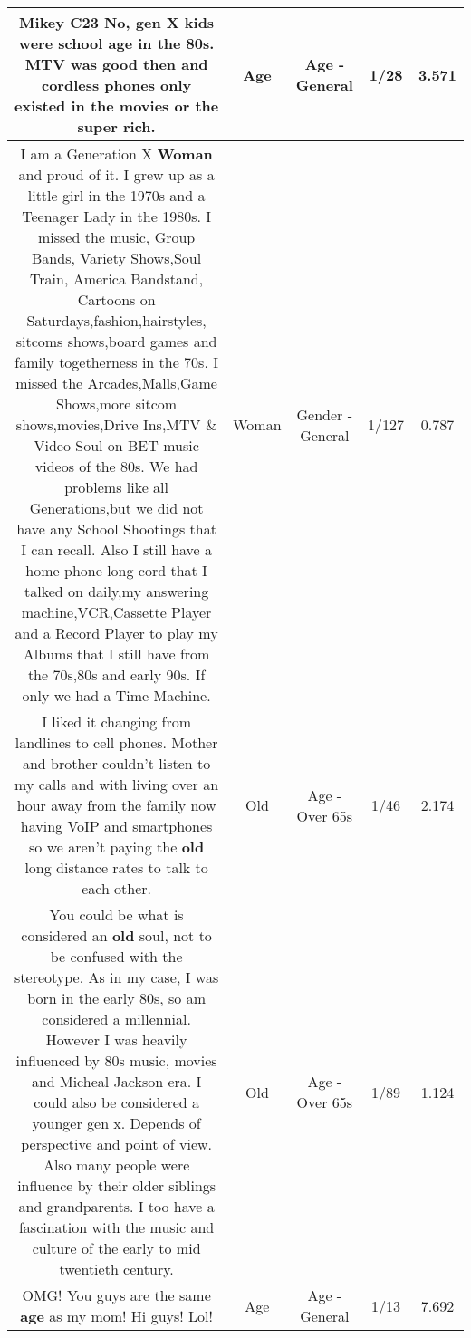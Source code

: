 \documentclass[11pt]{article}
\newlength\mylength
\begin{document}
\begin{center}
\begin{longtable}{|C{.65\mylength}|C{.30\mylength}|C{.12\mylength}|C{.12\mylength}|C{.12\mylength}|}
  \small Mikey C23   No, gen X kids were school \textbf{age} in the 80s. MTV was good then and cordless phones only existed in the movies or the super rich.\normalsize   & Age & Age - General & 1/28 & 3.571 \\  \hline
  \small I am a Generation X \textbf{Woman} and proud of it. I grew up as a little girl in the 1970s and a Teenager Lady in the 1980s. I missed the music, Group Bands, Variety Shows,Soul Train, America Bandstand, Cartoons on Saturdays,fashion,hairstyles, sitcoms shows,board games and family togetherness in the 70s. I missed the Arcades,Malls,Game Shows,more sitcom shows,movies,Drive Ins,MTV \& Video Soul on BET music videos of the 80s. We had problems like all Generations,but we did not have any School Shootings that I can recall. Also I still have a home phone long cord that I talked on daily,my answering machine,VCR,Cassette Player and a Record Player to play my Albums that I still have from the 70s,80s and early 90s. If only we had a Time Machine.\normalsize   & Woman & Gender - General & 1/127 & 0.787 \\  \hline
  \small I liked it changing from landlines to cell phones. Mother and brother couldn't listen to my calls and with living over an hour away from the family now having VoIP and  smartphones so we aren't paying the \textbf{old} long distance rates to talk to each other.\normalsize   & Old & Age - Over 65s & 1/46 & 2.174 \\  \hline
  \small You could be what is considered an \textbf{old} soul, not to be confused with the stereotype. As in my case, I was born in the early 80s, so am considered a millennial. However I was heavily influenced by 80s music, movies and Micheal Jackson era. I could also be considered a younger gen x. Depends of perspective and point of view. Also many people were influence by their older siblings and grandparents. I too have a fascination with the music and culture of the early to mid twentieth century.\normalsize   & Old & Age - Over 65s & 1/89 & 1.124 \\  \hline
  \small OMG! You guys are the same \textbf{age} as my mom! Hi guys! Lol!\normalsize   & Age & Age - General & 1/13 & 7.692 \\  \hline

\end{longtable}
\end{center}
\end{document}
